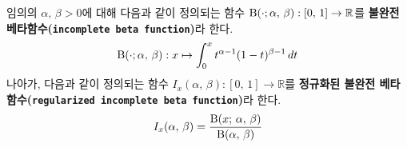 \begin{definition}
    임의의 $\alpha,\,\beta>0$에 대해 다음과 같이 정의되는 함수 $\mathrm{B}(\cdot;\alpha,\,\beta):[0,\,1]\to\mathbb{R}$를 \textbf{불완전 베타함수(\texttt{incomplete beta function})}라 한다.
    \begin{equation*}
        \mathrm{B}(\cdot;\alpha,\,\beta):x\mapsto\int_0^xt^{\alpha-1}(1-t)^{\beta-1}\,dt
    \end{equation*}
    나아가, 다음과 같이 정의되는 함수 $I_x(\alpha,\,\beta):[0,\,1]\to\mathbb{R}$를 \textbf{정규화된 불완전 베타함수(\texttt{regularized incomplete beta function})}라 한다.
    \begin{equation*}
        I_x(\alpha,\,\beta)=\frac{\mathrm{B}(x;\,\alpha,\,\beta)}{\mathrm{B}(\alpha,\,\beta)}
    \end{equation*}
\end{definition}

